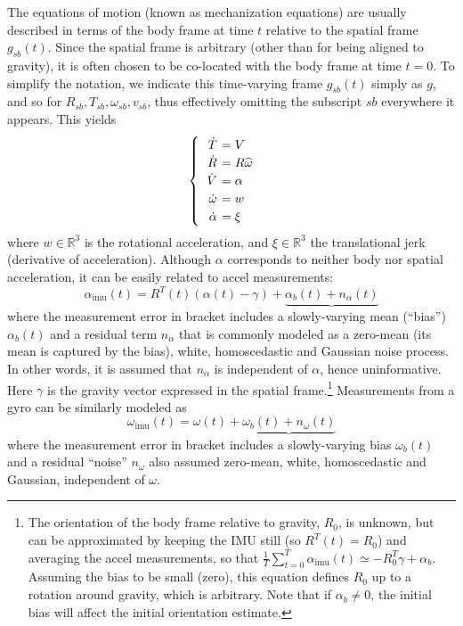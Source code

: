 \documentclass[]{article}
\def\real{\mathbb{R}}
\def\w{\omega}
\def\imu{_\mathrm{imu}}
\begin{document}
The equations of motion (known as mechanization equations) are usually described in terms of the body frame at time $t$ relative to the spatial frame $g_{sb}(t)$. Since the spatial frame is arbitrary (other than for being aligned to gravity), it is often chosen to be co-located with the body frame at time $t = 0$. To simplify the notation, we indicate this time-varying frame $g_{sb}(t)$ simply as $g$, and so for $R_{sb}, T_{sb}, \w_{sb}, v_{sb}$, thus effectively omitting the subscript $sb$ everywhere it appears. This yields
\begin{equation}
\begin{cases}
\begin{tabular}{>{$}r<{$} >{$\!\!\!\!\!}l<{$} }
\dot T &= V \\%
\dot R &= R \widehat \w \\%
\dot V &= \alpha  \\%
\dot \w &= w \\
\dot \alpha &= \xi
\end{tabular}
\end{cases}
\end{equation}
where $w \in \real^3$ is the rotational acceleration, and $\xi \in \real^3$ the translational jerk (derivative of acceleration). Although $\alpha$ corresponds to neither body nor spatial acceleration, it can be easily related to accel measurements: 
\begin{equation}
\boxed{\alpha\imu (t) = R^T(t) (\alpha(t)- \gamma) + \underbrace{\alpha_b(t) + n_{\alpha}(t)}}
\label{eq-accel}
\end{equation}
where the measurement error in bracket includes a slowly-varying mean (``bias'') $\alpha_b(t)$ and a residual term $n_\alpha$ that is commonly modeled as a zero-mean (its mean is captured by the bias), white, homoscedastic and Gaussian noise process. In other words, it is assumed that $n_\alpha$ is independent of $\alpha$, hence uninformative. Here $\gamma$ is the gravity vector expressed in the spatial frame.\footnote{The orientation of the body frame relative to gravity, $R_0$, is unknown, but can be approximated by keeping the IMU still (so $R^T(t) = R_0$) and averaging the accel measurements, so that $\frac{1}{T}\sum_{t=0}^T \alpha\imu (t)  \simeq  - R_0^T \gamma + \alpha_b$. Assuming the bias to be small (zero), this equation defines $R_0$ up to a rotation around gravity, which is arbitrary. Note that if $\alpha_b \neq 0$, the initial bias will affect the initial orientation estimate.} Measurements from a gyro can be similarly modeled as 
\begin{equation}
\boxed{\w\imu (t) = \w(t) + \underbrace{\w_b(t) + n_{\w}(t)}}
\label{eq-gyro}
\end{equation}
where the measurement error in bracket includes a slowly-varying bias $\w_b(t)$ and a residual ``noise'' $n_\w$ also assumed zero-mean, white, homoscedastic and Gaussian, independent of $\w$.
\end{document}
